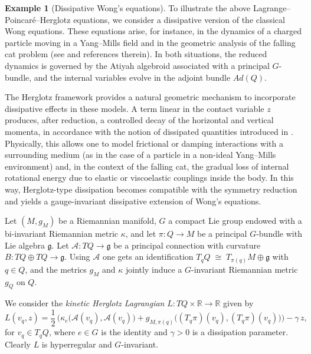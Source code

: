 \documentclass[11pt,a4paper]{article}
\theoremstyle{definition}
\newtheorem{example}[theorem]{Example}
\begin{document}
\begin{example}[Dissipative Wong's equations]\label{wong} To illustrate the above Lagrange--Poincaré--Herglotz equations, we consider a dissipative version of the classical Wong equations. These equations arise, for instance, in the dynamics of a charged particle moving in a Yang–Mills field and in the geometric analysis of the falling cat problem (see \cite{cendra2001lagrangian} and references therein). In both situations, the reduced dynamics is governed by the Atiyah algebroid associated with a principal $G$-bundle, and the internal variables evolve in the adjoint bundle $Ad(Q)$.

The Herglotz framework provides a natural geometric mechanism to incorporate dissipative effects in these models. A term linear in the contact variable $z$ produces, after reduction, a controlled decay of the horizontal and vertical momenta, in accordance with the notion of dissipated quantities introduced in \cite{de2021symmetries}. Physically, this allows one to model frictional or damping interactions with a surrounding medium (as in the case of a particle in a non-ideal Yang–Mills environment) and, in the context of the falling cat, the gradual loss of internal rotational energy due to elastic or viscoelastic couplings inside the body. In this way, Herglotz-type dissipation becomes compatible with the symmetry reduction and yields a gauge-invariant dissipative extension of Wong’s equations.

Let $(M, g_{M})$ be a Riemannian manifold, $G$ a compact Lie group endowed
with a bi-invariant Riemannian metric $\kappa$, and let $\pi : Q \to M$ be a
principal $G$-bundle with Lie algebra $\mathfrak{g}$. Let 
$\mathcal{A}: TQ \to {\mathfrak g}$ be a principal connection with curvature
$B:TQ\oplus TQ\to\mathfrak{g}$. Using $\mathcal{A}$ one gets an identification $T_qQ \;\cong\; T_{\pi(q)}M \oplus \mathfrak{g}$ with $q\in Q$, and the metrics $g_M$ and $\kappa$ jointly induce a $G$-invariant Riemannian
metric $g_Q$ on $Q$.

We consider the \emph{kinetic Herglotz Lagrangian}
$L:TQ\times\mathbb{R}\to\mathbb{R}$ given by
\begin{equation}\label{eq:Wong-unreduced-L}
L(v_q,z)
= \frac{1}{2}\,\Big(
\kappa_e\big(\mathcal{A}(v_q),\mathcal{A}(v_q)\big)
+ g_{M,\pi(q)}\big((T_q\pi)(v_q),(T_q\pi)(v_q)\big)
\Big) - \gamma\,z,
\end{equation}
for $v_q\in T_qQ$, where $e\in G$ is the identity and $\gamma>0$ is a
dissipation parameter. Clearly $L$ is hyperregular and $G$-invariant.


\end{example}
\end{document}
